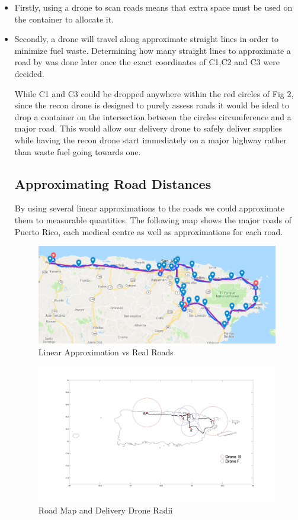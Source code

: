 \documentclass[a4paper,12pt]{article}
\begin{document}
\begin{itemize}
\item Firstly, using a drone to scan roads means that extra space must be used on the container to allocate it.
\item Secondly, a drone will travel along approximate straight lines in order to minimize fuel waste. Determining how many straight lines to approximate a road by was done later once the exact coordinates of C1,C2 and C3 were decided.


While C1 and C3 could be dropped anywhere within the red circles of Fig 2, since the recon drone is designed to purely assess roads it would be ideal to drop a container on the intersection between the circles circumference and a major road.
This would allow our delivery drone to safely deliver supplies while having the recon drone start immediately on a major highway rather than waste fuel going towards one.

\subsection{Approximating Road Distances}
By using several linear approximations to the roads we could approximate them to measurable quantities. The following map shows the major roads of Puerto Rico, each medical centre as well as approximations for each road.

\begin{figure}[h]
\centering
\includegraphics[scale =0.5]{ConnectedLineMap}
\caption{Linear Approximation vs Real Roads}
\label{road-approx}
\end{figure}

\begin{figure}[h]
\centering
\includegraphics[scale =0.15]{CircleRoadMap}
\caption{Road Map and Delivery Drone Radii}
\label{road-approx}
\end{figure}


\end{itemize}
\end{document}
